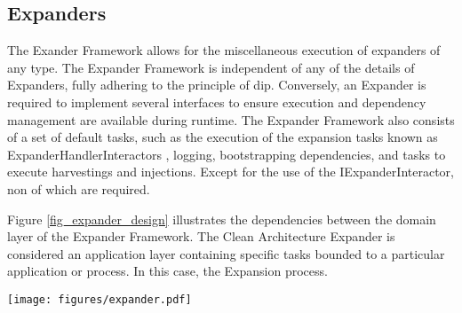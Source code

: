 \subsection{Expanders}

The Exander Framework allows for the miscellaneous execution of expanders of any type. The
Expander Framework is independent of any of the details of Expanders, fully adhering to
the principle of \gls{dip}. Conversely, an Expander is required to implement several
interfaces to ensure execution and dependency management are available during runtime. The
Expander Framework also consists of a set of default tasks, such as the execution of the
expansion tasks known as ExpanderHandlerInteractors
, logging, bootstrapping dependencies, and
tasks to execute harvestings and injections. Except for the use of the
IExpanderInteractor, non of which are required.

Figure \ref{fig_expander_design} illustrates the dependencies between the domain layer of
the Expander Framework. The Clean Architecture Expander is considered an application layer
containing specific tasks bounded to a particular application or process. In this case,
the Expansion process.

\begin{figure*}[htbp]
    \centering
    \texttt{[image: figures/expander.pdf]}
    \caption[The design of an Expander]{The design of an Expander}
    \label{fig_expander_design}
  \end{figure*}